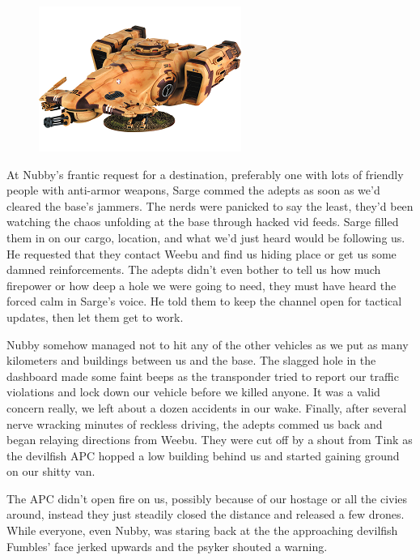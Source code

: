 \begin{figure}
	\begin{center}
		\includegraphics[width=\figwidth]{pics/10/68.png}
	\end{center}
\end{figure}
At Nubby's frantic request for a destination, preferably one with lots of friendly people with anti-armor weapons, Sarge commed the adepts as soon as we'd cleared the base's jammers. 
The nerds were panicked to say the least, they'd been watching the chaos unfolding at the base through hacked vid feeds. 
Sarge filled them in on our cargo, location, and what we'd just heard would be following us. 
He requested that they contact Weebu and find us hiding place or get us some damned reinforcements. 
The adepts didn't even bother to tell us how much firepower or how deep a hole we were going to need, they must have heard the forced calm in Sarge's voice. 
He told them to keep the channel open for tactical updates, then let them get to work.

Nubby somehow managed not to hit any of the other vehicles as we put as many kilometers and buildings between us and the base. 
The slagged hole in the dashboard made some faint beeps as the transponder tried to report our traffic violations and lock down our vehicle before we killed anyone. 
It was a valid concern really, we left about a dozen accidents in our wake. 
Finally, after several nerve wracking minutes of reckless driving, the adepts commed us back and began relaying directions from Weebu. 
They were cut off by a shout from Tink as the devilfish APC hopped a low building behind us and started gaining ground on our shitty van.

The APC didn't open fire on us, possibly because of our hostage or all the civies around, instead they just steadily closed the distance and released a few drones. 
While everyone, even Nubby, was staring back at the the approaching devilfish Fumbles' face jerked upwards and the psyker shouted a warning. 


